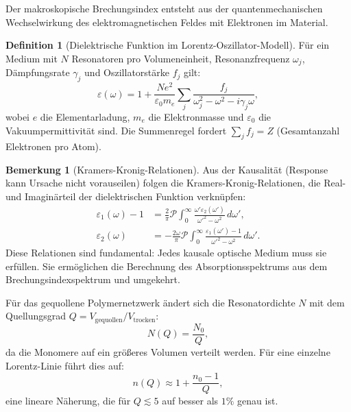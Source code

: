 ﻿\documentclass[a4paper,12pt]{article}
\theoremstyle{definition}
\newtheorem{definition}{Definition}[section]
\newtheorem{bemerkung}{Bemerkung}[section]
\begin{document}
	Der makroskopische Brechungsindex entsteht aus der quantenmechanischen
	Wechselwirkung des elektromagnetischen Feldes mit Elektronen im Material.
	
	\begin{definition}[Dielektrische Funktion im Lorentz-Oszillator-Modell]
		\label{def:lorentz}
		Für ein Medium mit $N$ Resonatoren pro Volumeneinheit, Resonanzfrequenz
		$\omega_j$, Dämpfungsrate $\gamma_j$ und Oszillatorstärke $f_j$ gilt:
		\begin{equation}
			\varepsilon(\omega) = 1 + \frac{N e^2}{\varepsilon_0 m_e}
			\sum_j \frac{f_j}{\omega_j^2 - \omega^2 - i\gamma_j \omega},
			\label{eq:lorentz}
		\end{equation}
		wobei $e$ die Elementarladung, $m_e$ die Elektronmasse und
		$\varepsilon_0$ die Vakuumpermittivität sind.
		Die Summenregel fordert $\sum_j f_j = Z$ (Gesamtanzahl Elektronen pro Atom).
	\end{definition}
	
	\begin{bemerkung}[Kramers-Kronig-Relationen]
		Aus der Kausalität (Response kann Ursache nicht vorauseilen) folgen die
		Kramers-Kronig-Relationen, die Real- und Imaginärteil der dielektrischen
		Funktion verknüpfen:
		\begin{align}
			\varepsilon_1(\omega) - 1 &= \frac{2}{\pi} \mathcal{P}
			\int_0^\infty \frac{\omega' \varepsilon_2(\omega')}{\omega'^2 - \omega^2}\, d\omega',\\
			\varepsilon_2(\omega) &= -\frac{2\omega}{\pi} \mathcal{P}
			\int_0^\infty \frac{\varepsilon_1(\omega') - 1}{\omega'^2 - \omega^2}\, d\omega'.
		\end{align}
		Diese Relationen sind fundamental: Jedes kausale optische Medium muss
		sie erfüllen. Sie ermöglichen die Berechnung des Absorptionsspektrums
		aus dem Brechungsindexspektrum und umgekehrt.
	\end{bemerkung}
	
	Für das gequollene Polymernetzwerk ändert sich die Resonatordichte $N$ mit
	dem Quellungsgrad $Q = V_\text{gequollen}/V_\text{trocken}$:
	\begin{equation}
		N(Q) = \frac{N_0}{Q},
		\label{eq:dichte-quellung}
	\end{equation}
	da die Monomere auf ein größeres Volumen verteilt werden.
	Für eine einzelne Lorentz-Linie führt dies auf:
	\begin{equation}
		n(Q) \approx 1 + \frac{n_0 - 1}{Q},
		\label{eq:n-quellung}
	\end{equation}
	eine lineare Näherung, die für $Q \lesssim 5$ auf besser als $1\%$ genau ist.
	
\end{document}
